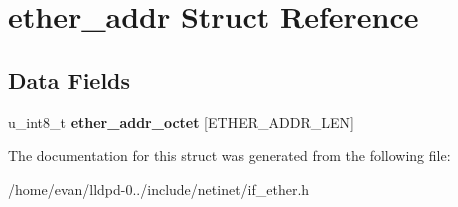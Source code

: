 \section{ether\-\_\-addr \-Struct \-Reference}
\label{structether__addr}
\subsection*{\-Data \-Fields}
\begin{DoxyCompactItemize}
\item 
u\-\_\-int8\-\_\-t {\bfseries ether\-\_\-addr\-\_\-octet} [\-E\-T\-H\-E\-R\-\_\-\-A\-D\-D\-R\-\_\-\-L\-E\-N]\label{structether__addr_a7d80b49df4966b41f4cc3f6cd546b376}

\end{DoxyCompactItemize}


\-The documentation for this struct was generated from the following file\-:\begin{DoxyCompactItemize}
\item 
/home/evan/lldpd-\/0../include/netinet/if\-\_\-ether.\-h\end{DoxyCompactItemize}
